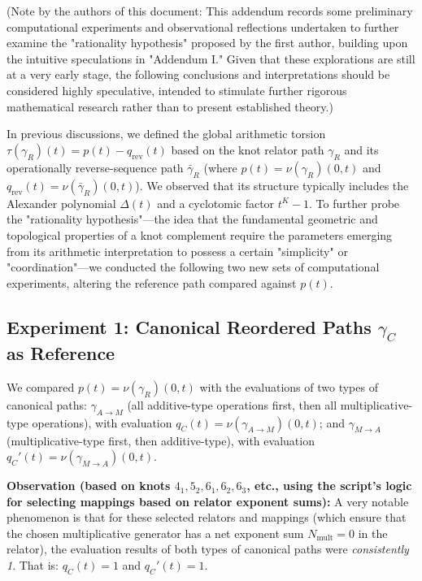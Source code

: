 \documentclass{article}[a4paper,12pt]
\begin{document}
(Note by the authors of this document: This addendum records some preliminary computational experiments and observational reflections undertaken to further examine the "rationality hypothesis" proposed by the first author, building upon the intuitive speculations in "Addendum I." Given that these explorations are still at a very early stage, the following conclusions and interpretations should be considered highly speculative, intended to stimulate further rigorous mathematical research rather than to present established theory.)

In previous discussions, we defined the global arithmetic torsion $\tau(\gamma_R)(t) = p(t) - q_{\text{rev}}(t)$ based on the knot relator path $\gamma_R$ and its operationally reverse-sequence path $\bar{\gamma}_R$ (where $p(t) = \nu(\gamma_R)(0,t)$ and $q_{\text{rev}}(t) = \nu(\bar{\gamma}_R)(0,t)$). We observed that its structure typically includes the Alexander polynomial $\Delta(t)$ and a cyclotomic factor $t^K-1$. To further probe the "rationality hypothesis"—the idea that the fundamental geometric and topological properties of a knot complement require the parameters emerging from its arithmetic interpretation to possess a certain "simplicity" or "coordination"—we conducted the following two new sets of computational experiments, altering the reference path compared against $p(t)$.

\subsection*{Experiment 1: Canonical Reordered Paths $\gamma_C$ as Reference}

We compared $p(t) = \nu(\gamma_R)(0,t)$ with the evaluations of two types of canonical paths: $\gamma_{A \to M}$ (all additive-type operations first, then all multiplicative-type operations), with evaluation $q_C(t) = \nu(\gamma_{A \to M})(0,t)$; and $\gamma_{M \to A}$ (multiplicative-type first, then additive-type), with evaluation $q_C'(t) = \nu(\gamma_{M \to A})(0,t)$.

\textbf{Observation (based on knots $4_1, 5_2, 6_1, 6_2, 6_3$, etc., using the script's logic for selecting mappings based on relator exponent sums):}
A very notable phenomenon is that for these selected relators and mappings (which ensure that the chosen multiplicative generator has a net exponent sum $N_{\text{mult}}=0$ in the relator), the evaluation results of both types of canonical paths were \emph{consistently 1}. That is:
$q_C(t) = 1$ and $q_C'(t) = 1$.
\end{document}
